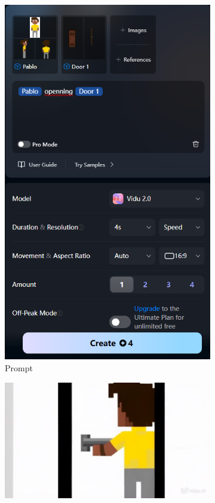 \begin{figure}[htbp]
    \centering
    \caption{\small Processo da utilização 5 do Vidu em agosto/2025}
    \label{fig:vidu10}
    \begin{subfigure}{0.35\linewidth}
        \includegraphics[width=1\linewidth]{figs/vidu/tela10.PNG}
        \caption{\small Prompt}
        \label{fig:vidu10a}
    \end{subfigure}
    \begin{subfigure}{0.55\linewidth}
        \includegraphics[width=1\linewidth]{figs/vidu/frame10.jpg}

\end{subfigure}
\end{figure}
